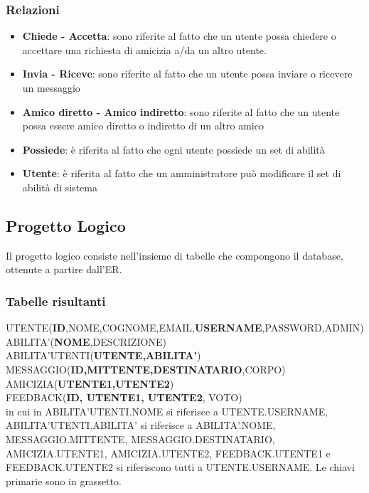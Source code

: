 \subsubsection{Relazioni}
\begin{itemize}
 \item {\bfseries Chiede - Accetta}: sono riferite al fatto che un utente possa chiedere o accettare una richiesta di amicizia a/da un altro utente.
 \item {\bfseries Invia - Riceve}: sono riferite al fatto che un utente possa inviare o ricevere un messaggio
 \item {\bfseries Amico diretto - Amico indiretto}: sono riferite al fatto che un utente possa essere amico diretto o indiretto di un altro amico
 \item {\bfseries Possiede}: è riferita al fatto che ogni utente possiede un set di abilità
 \item {\bfseries Utente}: è riferita al fatto che un amministratore può modificare il set di abilità di sistema
\end{itemize}

\subsection{Progetto Logico}
Il progetto logico consiste nell'insieme di tabelle che compongono il database, ottenute a partire dall'ER.
\subsubsection{Tabelle risultanti}
\noindent
UTENTE({\bfseries ID},NOME,COGNOME,EMAIL,{\bfseries USERNAME},PASSWORD,ADMIN)\\
ABILITA'({\bfseries NOME},DESCRIZIONE)\\
ABILITA'UTENTI({\bfseries UTENTE,ABILITA'})\\
MESSAGGIO({\bfseries ID,MITTENTE,DESTINATARIO},CORPO)\\
AMICIZIA({\bfseries UTENTE1,UTENTE2})\\
FEEDBACK({\bfseries ID, UTENTE1, UTENTE2}, VOTO)\\

\noindent
in cui in ABILITA'UTENTI.NOME si riferisce a UTENTE.USERNAME, ABILITA'UTENTI.ABILITA' si riferisce a ABILITA'.NOME, MESSAGGIO.MITTENTE, MESSAGGIO.DESTINATARIO, AMICIZIA.UTENTE1,
AMICIZIA.UTENTE2, FEEDBACK.UTENTE1 e FEEDBACK.UTENTE2 si riferiscono tutti a UTENTE.USERNAME. Le chiavi primarie sono in grassetto.

